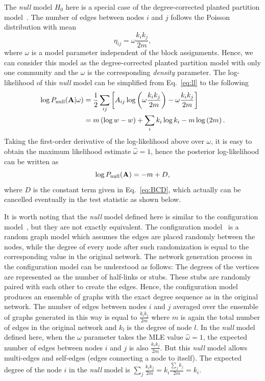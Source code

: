 The {\it null} model $H_0$ here is a special case of the degree-corrected planted partition model~\cite{newman2016equivalence}. The number of edges between nodes $i$ and $j$ follows the Poisson distribution with mean
\begin{equation}
    \eta_{ij} = \omega \frac{k_i k_j}{2m},
\end{equation}
where $\omega$ is a model parameter independent of the block assignments. Hence, we can consider this model as the degree-corrected planted partition model with only one community and the $\omega$ is the corresponding {\it density} parameter. The log-likelihood of this \textit{null} model can be simplified from Eq.~\ref{eq:ll} to the following
\begin{equation} 
\begin{split}
    \log P_{\text{null}}({\bf A}|\omega) &= \frac{1}{2} \sum_{ij} \left[ A_{ij} \log \left(\omega\frac{k_i k_j}{2m} \right) - \omega\frac{k_i k_j}{2m} \right] \\
                           &= m \left(\log w - w\right) + \sum_i k_i \log k_i - m \log \left(2m\right) .
\end{split}
\end{equation}
Taking the first-order derivative of the log-likelihood above over $\omega$, it is easy to obtain the maximum likelihood estimate $\hat{\omega} = 1$, hence the posterior log-likelihood can be written as
\begin{equation} \label{eq:null_ll}
\log P_{\text{null}}({\bf A}) = - m + D,
\end{equation}
where $D$ is the constant term given in Eq.~\ref{eq:BCD}, which actually can be cancelled eventually in the test statistic as shown below.

It is worth noting that the {\it null} model defined here is similar to the configuration model~\cite{molloy1995critical}, but they are not exactly equivalent. The configuration model~\cite{molloy1995critical} is a random graph model which assumes the edges are placed randomly between the nodes, while the degree of every node after such randomization is equal to the corresponding value in the original network. The network generation process in the configuration model can be understood as follows: The degrees of the vertices are represented as the number of half-links or stubs. These stubs are randomly paired with each other to create the edges. Hence, the configuration model produces an ensemble of graphs with the exact degree sequence as in the original network. The number of edges between nodes $i$ and $j$ averaged over the ensemble of graphs generated in this way is equal to $\frac{k_i k_j}{2m}$ where $m$ is again the total number of edges in the original network and $k_l$ is the degree of node $l$. In the {\it null} model defined here, when the $\omega$ parameter takes the MLE value $\hat{\omega} = 1$, the expected number of edges between nodes $i$ and $j$ is also $\frac{k_i k_j}{2m}$. But this {\it null} model allows multi-edges and self-edges (edges connecting a node to itself). The expected degree of the node $i$ in the {\it null} model is $\sum_j \frac{k_i k_j}{2m} = k_i \frac{\sum_j k_j}{2m} = k_i$.


